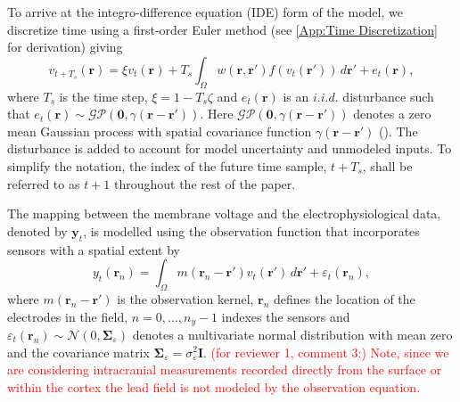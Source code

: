\documentclass[review,authoryear,3p]{elsarticle}
\newcommand{\dean}[1]{\textcolor{red}{#1}}
\begin{document}
To arrive at the integro-difference equation (IDE) form of the model, we discretize time using a first-order Euler method (see \ref{App:Time Discretization} for derivation) giving 
\begin{equation}
	\label{DiscreteTimeModel} 
	v_{t+T_s}\left(\mathbf{r}\right) = 
	\xi v_t\left(\mathbf{r}\right) + 
	T_s \int_\Omega { 
	    w\left(\mathbf{r},\mathbf{r}'\right)
	    f\left(v_t\left(\mathbf{r}'\right)\right) 
	\, d\mathbf{r}'} 
	+ e_t\left(\mathbf{r}\right), 
\end{equation}
where $T_s$ is the time step, $\xi = 1-T_s\zeta $ and $e_t(\mathbf{r})$ is an $i.i.d.$ disturbance such that $e_t(\mathbf{r})\sim\mathcal{GP}(\mathbf 0,\gamma(\mathbf{r}-\mathbf{r}'))$. Here $\mathcal{GP}(\mathbf 0,\gamma(\mathbf{r}-\mathbf{r}'))$ denotes a zero mean Gaussian process with spatial covariance function $\gamma(\mathbf{r}-\mathbf{r}')$ (\cite{Rasmussen2005}). The disturbance is added to account for model uncertainty and unmodeled inputs. To simplify the notation, the index of the future time sample, $t+T_s$, shall be referred to as $t+1$ throughout the rest of the paper. 

The mapping between the membrane voltage and the electrophysiological data, denoted by $\mathbf{y}_t$, is modelled using the observation function that incorporates sensors with a spatial extent by
\begin{equation}\label{eq:ObservationEquation}
	y_t(\mathbf{r}_n) = \int_{\Omega} { m\left(\mathbf{r}_n-\mathbf{r}'\right) v_t\left(\mathbf{r}'\right) \, d\mathbf{r}'} + \varepsilon_t(\mathbf{r}_n), 
\end{equation}
where $m\left(\mathbf{r}_n-\mathbf{r}'\right)$ is the observation kernel, $\mathbf{r}_n$ defines the location of the electrodes in the field, $n=0,...,n_y-1$ indexes the sensors and $\varepsilon_t(\mathbf{r}_n) \sim \mathcal{N}\left(0,\boldsymbol{\Sigma}_{\varepsilon}\right)$ denotes a multivariate normal distribution with mean zero and the covariance matrix $\boldsymbol{\Sigma}_{\varepsilon} = \sigma_{\varepsilon}^2\mathbf{I}$. \dean{(for reviewer 1, comment 3:) Note, since we are considering intracranial measurements recorded directly from the surface or within the cortex the lead field is not modeled by the observation equation.} 
\end{document}
